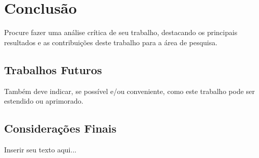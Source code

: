 
\chapter{Conclusão}
\label{chap_conclusao}

Procure fazer uma análise crítica de seu trabalho, destacando os principais resultados e as contribuições deste trabalho para a área de pesquisa.

\section{Trabalhos Futuros}
\label{sec_trabalhos_futuros}

Também deve indicar, se possível e/ou conveniente, como este trabalho pode ser estendido ou aprimorado.

\section{Considerações Finais}
\label{sec_consideracoes_finais}

Inserir seu texto aqui...

